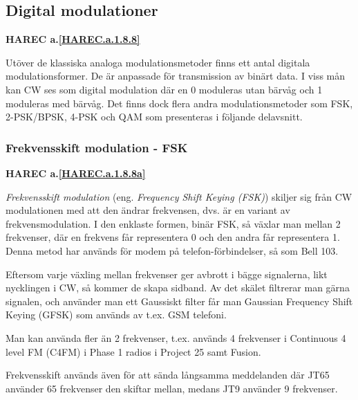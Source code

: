 \subsection{Digital modulationer}
\textbf{HAREC a.\ref{HAREC.a.1.8.8}\label{myHAREC.a.1.8.8}}

\begin{rev-nytt}[MAD]
Utöver de klassiska analoga modulationsmetoder finns ett antal digitala
modulationsformer. De är anpassade för transmission av binärt data. I viss mån
kan CW ses som digital modulation där en 0 moduleras utan bärvåg och 1 moduleras
med bärvåg. Det finns dock flera andra modulationsmetoder som FSK, 2-PSK/BPSK,
4-PSK och QAM som presenteras i följande delavsnitt.

\end{rev-nytt}

\subsubsection{Frekvensskift modulation - FSK}
\textbf{HAREC a.\ref{HAREC.a.1.8.8a}\label{myHAREC.a.1.8.8a}}
\begin{rev-nytt}[MAD]

\emph{Frekvensskift modulation} (eng. \emph{Frequency Shift Keying (FSK)})
skiljer sig från CW modulationen med att den ändrar frekvensen, dvs. är en
variant av frekvensmodulation. I den enklaste formen, binär FSK, så växlar man
mellan 2 frekvenser, där en frekvens får representera 0 och den andra får
representera 1. Denna metod har används för modem på telefon-förbindelser,
så som Bell 103.

Eftersom varje växling mellan frekvenser ger avbrott i bägge signalerna,
likt nycklingen i CW, så kommer de skapa sidband. Av det skälet filtrerar man
gärna signalen, och använder man ett Gaussiskt filter får man Gaussian Frequency
Shift Keying (GFSK) som används av t.ex. GSM telefoni.

Man kan använda fler än 2 frekvenser, t.ex. används 4 frekvenser i Continuous
4 level FM (C4FM) i Phase 1 radios i Project 25 samt Fusion.

Frekvensskift används även för att sända långsamma meddelanden där JT65
använder 65 frekvenser den skiftar mellan, medans JT9 använder 9 frekvenser.

\end{rev-nytt}

